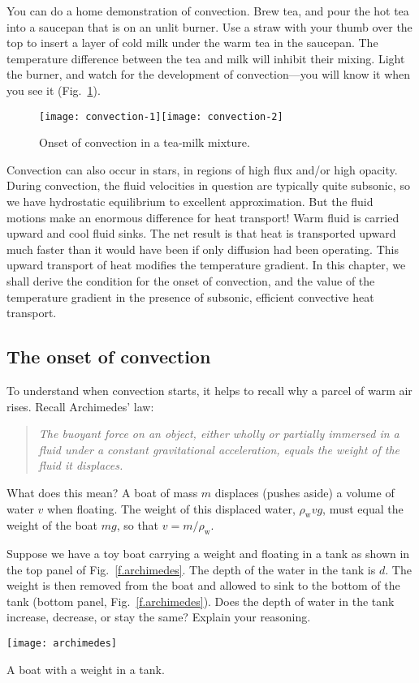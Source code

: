 You can do a home demonstration of convection.  Brew tea, and pour the hot tea into a saucepan that is on an unlit burner. Use a straw with your thumb over the top to insert a layer of cold milk under the warm tea in the saucepan. The temperature difference between the tea and milk will inhibit their mixing. Light the burner, and watch for the development of convection---you will know it when you see it (Fig.~\ref{f.tea}).

\begin{figure}[htbp]
\texttt{[image: convection-1]}\texttt{[image: convection-2]}
\caption[Onset of convection]{Onset of convection in a tea-milk mixture.\label{f.tea}}
\end{figure}

Convection can also occur in stars, in regions of high flux and/or high opacity. During convection, the fluid velocities in question are typically quite subsonic, so we have hydrostatic equilibrium to excellent approximation. But the fluid motions make an enormous difference for heat transport! Warm fluid is carried upward and cool fluid sinks. The net result is that heat is transported upward much faster than it would have been if only diffusion had been operating. This upward transport of heat modifies the temperature gradient. In this chapter, we shall derive the condition for the onset of convection, and the value of the temperature gradient in the presence of subsonic, efficient convective heat transport.

\subsection{The onset of convection}\label{s.convection-onset}

To understand when convection starts, it helps to recall why a parcel of warm air rises. Recall Archimedes' law:
\begin{quote}\itshape
The buoyant force on an object, either wholly or partially immersed in a fluid under a constant gravitational acceleration, equals the weight of the fluid it displaces.
\end{quote}
What does this mean? A boat of mass $m$ displaces (pushes aside) a volume of water $v$ when floating. The weight of this displaced water, $\rho_{\mathrm{w}}v g$, must equal the weight of the boat $mg$, so that $v = m/\rho_{\mathrm{w}}$.

\begin{exercisebox}
Suppose we have a toy boat carrying a weight and floating in a tank as shown in the top panel of Fig.~\ref{f.archimedes}. The depth of the water in the tank is $d$. The weight is then removed from the boat and allowed to sink to the bottom of the tank (bottom panel, Fig.~\ref{f.archimedes}). Does the depth of water in the tank increase, decrease, or stay the same? Explain your reasoning.
\end{exercisebox}
\begin{marginfigure}
\texttt{[image: archimedes]}
\caption[A boat with a weight]{\label{f.archimedes} A boat with a weight in a tank.}
\end{marginfigure}


